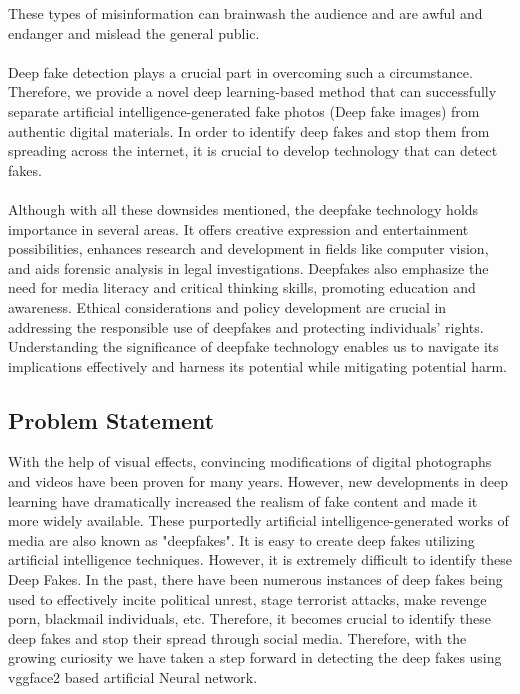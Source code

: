 \documentclass[12 pt]{article}
\begin{document}
These types of misinformation can brainwash the audience and are awful and endanger and mislead the general public.
\\
\\
Deep fake detection plays a crucial part in overcoming such a circumstance. Therefore, we provide a novel deep learning-based method that can successfully separate artificial intelligence-generated fake photos (Deep fake images) from authentic digital materials. In order to identify deep fakes and stop them from spreading across the internet, it is crucial to develop technology that can detect fakes.
\\\\
Although with all these downsides mentioned, the deepfake technology holds importance in several areas. It offers creative expression and entertainment possibilities, enhances research and development in fields like computer vision, and aids forensic analysis in legal investigations. Deepfakes also emphasize the need for media literacy and critical thinking skills, promoting education and awareness. Ethical considerations and policy development are crucial in addressing the responsible use of deepfakes and protecting individuals' rights. Understanding the significance of deepfake technology enables us to navigate its implications effectively and harness its potential while mitigating potential harm.

\subsection{Problem Statement}
With the help of visual effects, convincing modifications of digital photographs and videos have been proven for many years. However, new developments in deep learning have dramatically increased the realism of fake content and made it more widely available.   These purportedly artificial intelligence-generated works of media are also known as "deepfakes". It is easy to create deep fakes utilizing artificial intelligence techniques. However, it is extremely difficult to identify these Deep Fakes. In the past, there have been numerous instances of deep fakes being used to effectively incite political unrest, stage terrorist attacks, make revenge porn, blackmail individuals, etc. Therefore, it becomes crucial to identify these deep fakes and stop their spread through social media. Therefore, with the growing curiosity we have taken a
step forward in detecting the deep fakes using vggface2 based artificial Neural network.
\newpage
\end{document}
